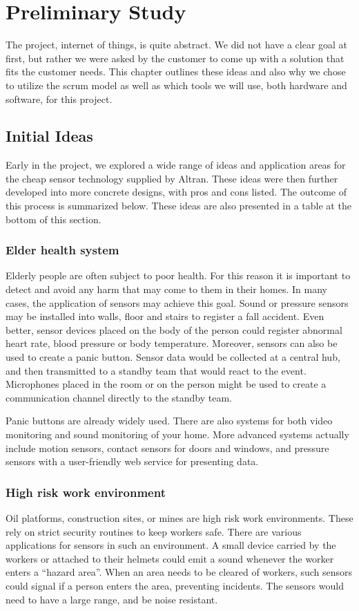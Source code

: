 \documentclass[../document]{subfiles}
\begin{document}
\section{Preliminary Study}
The project, internet of things, is quite abstract. We did not have a clear goal at first, but rather we were asked by the customer to come up with a solution that fits the customer needs. This chapter outlines these ideas and also why we chose to utilize the scrum model as well as which tools we will use, both hardware and software, for this project.

\subsection{Initial Ideas}
Early in the project, we explored a wide range of ideas and application areas for the cheap sensor technology supplied by Altran. These ideas were then further developed into more concrete designs, with pros and cons listed. The outcome of this process is summarized below. These ideas are also presented in a table at the bottom of this section.

\subsubsection{Elder health system}
Elderly people are often subject to poor health. For this reason it is important to detect and avoid any harm that may come to them in their homes. In many cases, the application of sensors may achieve this goal. Sound or pressure sensors may be installed into walls, floor and stairs to register a fall accident. Even better, sensor devices placed on the body of the person could register abnormal heart rate, blood pressure or body temperature. Moreover, sensors can also be used to create a panic button. Sensor data would be collected at a central hub, and then transmitted to a standby team that would react to the event. Microphones placed in the room or on the person might be used to create a communication channel directly to the standby team.

Panic buttons are already widely used. There are also systems for both video monitoring and sound monitoring of your home. More advanced systems actually include motion sensors, contact sensors for doors and windows, and pressure sensors with a user-friendly web service for presenting data.

\subsubsection{High risk work environment}
Oil platforms, construction sites, or mines are high risk work environments. These rely on strict security routines to keep workers safe. There are various applications for sensors in such an environment. A small device carried by the workers or attached to their helmets could emit a sound whenever the worker enters a “hazard area”. When an area needs to be cleared of workers, such sensors could signal if a person enters the area, preventing incidents. The sensors would need to have a large range, and be noise resistant.
\end{document}
